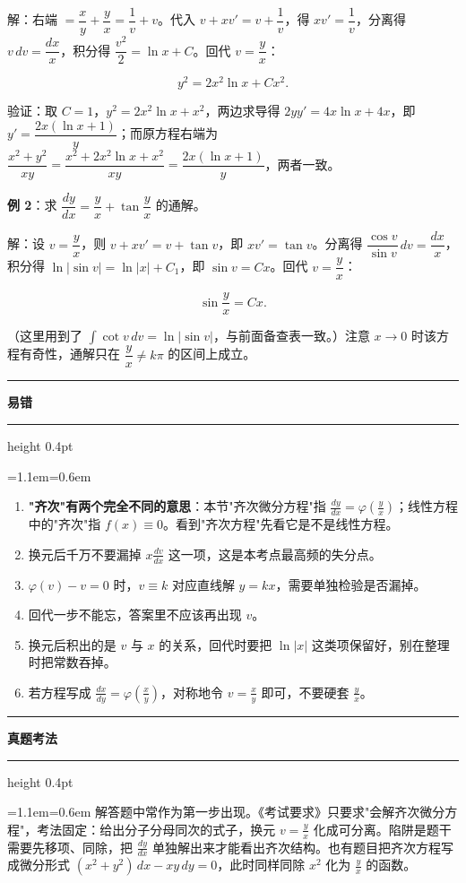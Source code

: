 \documentclass[11pt,openany,UTF8]{ctexbook}
\newcommand{\callouthead}[2]{%
  \par\addvspace{7pt}\noindent
  {\color{#1}\rule[-0.15em]{3pt}{1.05em}}\hspace{0.5em}%
  {\bfseries\color{#1}#2}\par\nobreak\vspace{-0.35em}%
  {\color{rulesep}\hrule height 0.4pt}\nobreak\vspace{0.45em}%
  \begingroup\small\setlength{\parindent}{0pt}%
  \leftskip=1.1em\rightskip=0.6em\noindent\ignorespaces}
\newcommand{\calloutend}{\par\endgroup\addvspace{7pt}}
\newenvironment{callwarn}[1]{\callouthead{warnbar}{#1}}{\calloutend}
\newenvironment{callexam}[1]{\callouthead{exambar}{#1}}{\calloutend}
\begin{document}
解：右端 $=\dfrac{x}{y}+\dfrac{y}{x}=\dfrac1v+v$。代入 $v+xv'=v+\dfrac1v$，得 $xv'=\dfrac1v$，分离得 $v\,dv=\dfrac{dx}{x}$，积分得 $\dfrac{v^{2}}{2}=\ln x+C$。回代 $v=\dfrac yx$：

\[y^{2}=2x^{2}\ln x+Cx^{2} .\]

验证：取 $C=1$，$y^{2}=2x^{2}\ln x+x^{2}$，两边求导得 $2yy'=4x\ln x+4x$，即 $y'=\dfrac{2x(\ln x+1)}{y}$；而原方程右端为 $\dfrac{x^{2}+y^{2}}{xy}=\dfrac{x^{2}+2x^{2}\ln x+x^{2}}{xy}=\dfrac{2x(\ln x+1)}{y}$，两者一致。

\textbf{例 2}：求 $\dfrac{dy}{dx}=\dfrac{y}{x}+\tan\dfrac yx$ 的通解。

解：设 $v=\dfrac yx$，则 $v+xv'=v+\tan v$，即 $x v'=\tan v$。分离得 $\dfrac{\cos v}{\sin v}\,dv=\dfrac{dx}{x}$，积分得 $\ln\vert\sin v\vert=\ln\vert x\vert+C_1$，即 $\sin v=Cx$。回代 $v=\dfrac yx$：

\[\sin\frac yx=Cx .\]

（这里用到了 $\int\cot v\,dv=\ln\vert\sin v\vert$，与前面备查表一致。）注意 $x\to 0$ 时该方程有奇性，通解只在 $\dfrac yx\ne k\pi$ 的区间上成立。

\begin{callwarn}{易错}
\begin{enumerate}
\item \textbf{"齐次"有两个完全不同的意思}：本节"齐次微分方程"指 $\frac{dy}{dx}=\varphi(\frac yx)$；线性方程中的"齐次"指 $f(x)\equiv 0$。看到"齐次方程"先看它是不是线性方程。
\item 换元后千万不要漏掉 $x\frac{dv}{dx}$ 这一项，这是本考点最高频的失分点。
\item $\varphi(v)-v=0$ 时，$v\equiv k$ 对应直线解 $y=kx$，需要单独检验是否漏掉。
\item 回代一步不能忘，答案里不应该再出现 $v$。
\item 换元后积出的是 $v$ 与 $x$ 的关系，回代时要把 $\ln\vert x\vert$ 这类项保留好，别在整理时把常数吞掉。
\item 若方程写成 $\frac{dx}{dy}=\varphi(\frac xy)$，对称地令 $v=\frac xy$ 即可，不要硬套 $\frac yx$。
\end{enumerate}
\end{callwarn}

\begin{callexam}{真题考法}
解答题中常作为第一步出现。《考试要求》只要求"会解齐次微分方程"，考法固定：给出分子分母同次的式子，换元 $v=\frac yx$ 化成可分离。陷阱是题干需要先移项、同除，把 $\frac{dy}{dx}$ 单独解出来才能看出齐次结构。也有题目把齐次方程写成微分形式 $(x^{2}+y^{2})\,dx-xy\,dy=0$，此时同样同除 $x^{2}$ 化为 $\frac yx$ 的函数。

\end{callexam}
\end{document}
